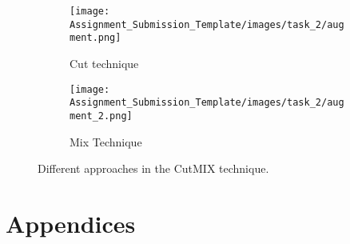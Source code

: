 \documentclass{article} %
\begin{document}
\begin{figure}[h!]
	\centering
	\begin{subfigure}{0.5\linewidth}
		\texttt{[image: Assignment\_Submission\_Template/images/task\_2/augment.png]}
		\caption{Cut technique}
		\label{fig:subfigA}
	\end{subfigure}	
	\begin{subfigure}{0.49\linewidth}
	        \texttt{[image: Assignment\_Submission\_Template/images/task\_2/augment\_2.png]}
	        \caption{Mix Technique}
	        \label{fig:subfigC}
         \end{subfigure}
	\caption{Different approaches in the CutMIX technique.}
	\label{fig:subfigures}
\end{figure}

\clearpage

\clearpage

\appendix

\section*{Appendices}
\end{document}
